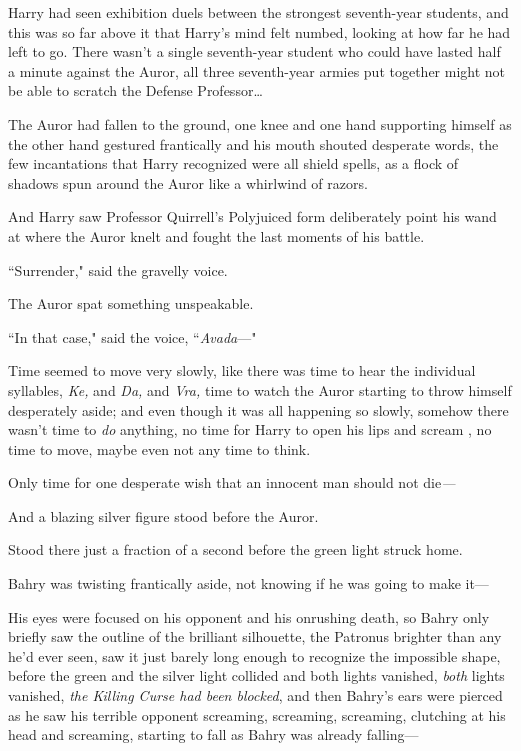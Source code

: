 Harry had seen exhibition duels between the strongest seventh-year students, and this was so far above it that Harry's mind felt numbed, looking at how far he had left to go. There wasn't a single seventh-year student who could have lasted half a minute against the Auror, all three seventh-year armies put together might not be able to scratch the Defense Professor{\ldots}

The Auror had fallen to the ground, one knee and one hand supporting himself as the other hand gestured frantically and his mouth shouted desperate words, the few incantations that Harry recognized were all shield spells, as a flock of shadows spun around the Auror like a whirlwind of razors.

And Harry saw Professor Quirrell's Polyjuiced form deliberately point his wand at where the Auror knelt and fought the last moments of his battle.

``Surrender," said the gravelly voice.

The Auror spat something unspeakable.

``In that case," said the voice, ``\emph{Avada}—"

Time seemed to move very slowly, like there was time to hear the individual syllables, \emph{Ke,} and \emph{Da,} and \emph{Vra,} time to watch the Auror starting to throw himself desperately aside; and even though it was all happening so slowly, somehow there wasn't time to \emph{do} anything, no time for Harry to open his lips and scream , no time to move, maybe even not any time to think.

Only time for one desperate wish that an innocent man should not die\emph{—}

And a blazing silver figure stood before the Auror.

Stood there just a fraction of a second before the green light struck home.

\later

Bahry was twisting frantically aside, not knowing if he was going to make it—

His eyes were focused on his opponent and his onrushing death, so Bahry only briefly saw the outline of the brilliant silhouette, the Patronus brighter than any he'd ever seen, saw it just barely long enough to recognize the impossible shape, before the green and the silver light collided and both lights vanished, \emph{both} lights vanished, \emph{the Killing Curse had been blocked}, and then Bahry's ears were pierced as he saw his terrible opponent screaming, screaming, screaming, clutching at his head and screaming, starting to fall as Bahry was already falling—

